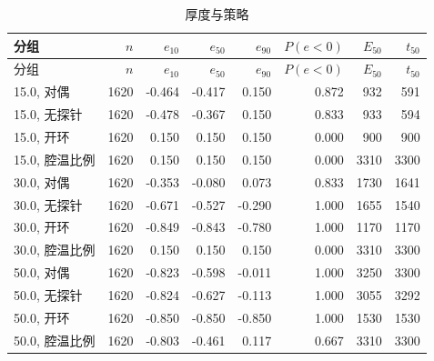 \begin{longtable}{lrrrrrrr}
\caption{厚度与策略}\\
\toprule
分组 & $n$ & $e_{10}$ & $e_{50}$ & $e_{90}$ & $P(e{<}0)$ & $E_{50}$ & $t_{50}$ \\
\midrule
\endfirsthead
\toprule
分组 & $n$ & $e_{10}$ & $e_{50}$ & $e_{90}$ & $P(e{<}0)$ & $E_{50}$ & $t_{50}$ \\
\midrule
\endhead
15.0, 对偶 & 1620 & -0.464 & -0.417 & 0.150 & 0.872 & 932 & 591 \\
15.0, 无探针 & 1620 & -0.478 & -0.367 & 0.150 & 0.833 & 933 & 594 \\
15.0, 开环 & 1620 & 0.150 & 0.150 & 0.150 & 0.000 & 900 & 900 \\
15.0, 腔温比例 & 1620 & 0.150 & 0.150 & 0.150 & 0.000 & 3310 & 3300 \\
30.0, 对偶 & 1620 & -0.353 & -0.080 & 0.073 & 0.833 & 1730 & 1641 \\
30.0, 无探针 & 1620 & -0.671 & -0.527 & -0.290 & 1.000 & 1655 & 1540 \\
30.0, 开环 & 1620 & -0.849 & -0.843 & -0.780 & 1.000 & 1170 & 1170 \\
30.0, 腔温比例 & 1620 & 0.150 & 0.150 & 0.150 & 0.000 & 3310 & 3300 \\
50.0, 对偶 & 1620 & -0.823 & -0.598 & -0.011 & 1.000 & 3250 & 3300 \\
50.0, 无探针 & 1620 & -0.824 & -0.627 & -0.113 & 1.000 & 3055 & 3292 \\
50.0, 开环 & 1620 & -0.850 & -0.850 & -0.850 & 1.000 & 1530 & 1530 \\
50.0, 腔温比例 & 1620 & -0.803 & -0.461 & 0.117 & 0.667 & 3310 & 3300 \\
\bottomrule
\end{longtable}

